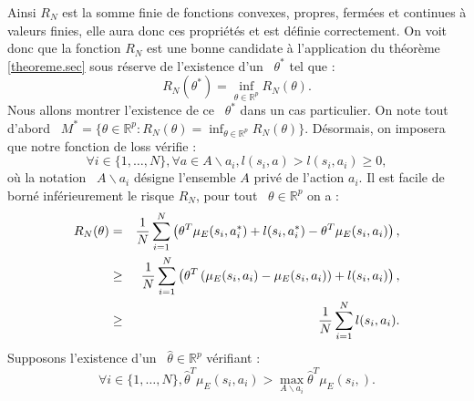 \documentclass[publibook-draft]{CAp2012}
\begin{document}
Ainsi $R_N$ est la somme finie de fonctions convexes, propres, fermées et continues à valeurs finies, elle aura donc ces propriétés et est définie correctement. On voit donc que la fonction $R_N$ est une bonne candidate à l'application du théorème \ref{theoreme.sec} sous réserve de l'existence d'un ~$\theta^*$ tel que :
\begin{equation}
R_N(\theta^*)=\inf_{\theta \in \mathbb{R}^p}R_N(\theta).
\end{equation}
Nous allons montrer l'existence de ce ~$\theta^*$ dans un cas particulier. On note tout d'abord ~$M^*=\{\theta\in\mathbb{R}^p:R_N(\theta)=\inf_{\theta \in \mathbb{R}^p}R_N(\theta)\}$.
Désormais, on imposera que notre fonction de loss vérifie :
\begin{equation}
\forall i\in\{1,\dots,N\}, \forall a \in A \backslash a_i, l(s_i,a)>l(s_i,a_i)\geq0,
\end{equation}
où la notation ~$A \backslash a_i$ désigne l'ensemble $A$ privé de l'action $a_i$.
Il est facile de borné inférieurement le risque $R_N$, pour tout ~$\theta\in\mathbb{R}^p$ on a :
\begin{eqnarray}
   R_N(\theta) &=& {1\over N} \sum_{i=1}^N\left(\theta ^T \mu_E(s_i,a^*_i) + l(s_i,a^*_i) - \theta ^T \mu_E(s_i,a_i) \right),\\
   &\geq& {1\over N} \sum_{i=1}^N\left(\theta^T\left(\mu_E(s_i,a_i) - \mu_E(s_i,a_i)\right) + l(s_i,a_i)  \right),\\
   &\geq& {1\over N} \sum_{i=1}^Nl(s_i,a_i).
\end{eqnarray}
Supposons l'existence d'un ~$\hat{\theta}\in\mathbb{R}^p$ vérifiant :
\begin{equation}\label{eq:existence}
\forall i\in\{1,\dots,N\}, \hat{\theta}^T\mu_E(s_i,a_i)>\max_{A \backslash a_i}\hat{\theta}^T\mu_E(s_i,).
\end{equation}
\end{document}
